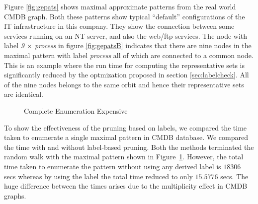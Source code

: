 \smallskip{}
Figure \ref{fig:gepats} shows maximal approximate
patterns from the real world CMDB graph. Both these patterns show
typical ``default'' 
configurations of the IT infrastructure in this company. They show the
connection between some services running on an NT server, and also the
web/ftp services. The node with label \textit{9 $\times$ process} 
in figure \ref{fig:gepatsB} indicates that there are nine nodes 
in the maximal pattern with label \textit{process} all of which
are connected to a common node. This is an example where the run time
for computing the representative sets is significantly reduced by
the optmization proposed in section \ref{sec:labelcheck}. All of the nine
nodes belongs to the same orbit and hence their representative sets are
identical.




\begin{figure}
    \centering
    \caption{Complete Enumeration Expensive}
    \label{fig:geex}
\end{figure}



To show the effectiveness of the pruning based on labels, we compared
the time taken to enumerate a single maximal pattern in CMDB database.
We compared the time with and without label-based pruning.
Both the methods terminated the random walk with the maximal pattern
shown in Figure~\ref{fig:geex}.  
However, the total time taken to enumerate the pattern
without using any derived label is $18306$ secs whereas by using the
\ncl label the total time reduced to only $15.5776$ secs. The huge
difference between the times arises due to the multiplicity effect in
CMDB graphs.  


